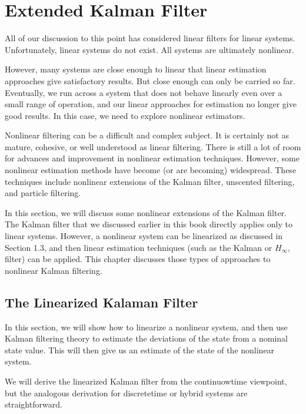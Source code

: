 \section{Extended Kalman Filter}
\label{extended_kalman_filter}

All of  our discussion to this point has considered linear filters for linear systems.
Unfortunately, linear systems do not  exist.  All systems are ultimately nonlinear.

However, many systems are  close enough to linear that linear estimation approaches give satisfactory results. 
But  close enough can only be carried so far.  Eventually, we run across a system 
that does not behave linearly even over a small range of  operation, and our linear 
approaches for  estimation  no longer give good results.  In this case, we  need  to  explore nonlinear estimators. 

Nonlinear filtering can be a difficult and complex subject.  It is certainly not as 
mature, cohesive, or well understood  as linear filtering. There is still a lot of  room 
for advances and improvement in nonlinear estimation techniques.  However, some 
nonlinear  estimation methods have become  (or are becoming) widespread.  These 
techniques  include nonlinear  extensions of  the Kalman filter,  unscented  filtering, 
and particle filtering.

In this section, we will discuss some nonlinear extensions of  the Kalman filter. 
The Kalman filter  that we  discussed earlier  in this book  directly  applies only to 
linear  systems.  However,  a  nonlinear  system  can  be  linearized  as discussed  in 
Section  1.3, and then  linear  estimation  techniques  (such  as the  Kalman  or  $H_{\infty}$, 
filter) can be applied.  This chapter discusses those types of approaches to nonlinear 
Kalman filtering.



\subsection{The Linearized Kalaman Filter }
In  this section, we  will show how  to linearize a nonlinear system, and  then  use 
Kalman  filtering theory to estimate the  deviations  of  the state  from a  nominal 
state value. This will then give us an estimate of the state of the nonlinear system.

We will derive the linearized Kalman filter from the continuowtime viewpoint, but 
the analogous derivation for discretetime or hybrid systems are straightforward.

